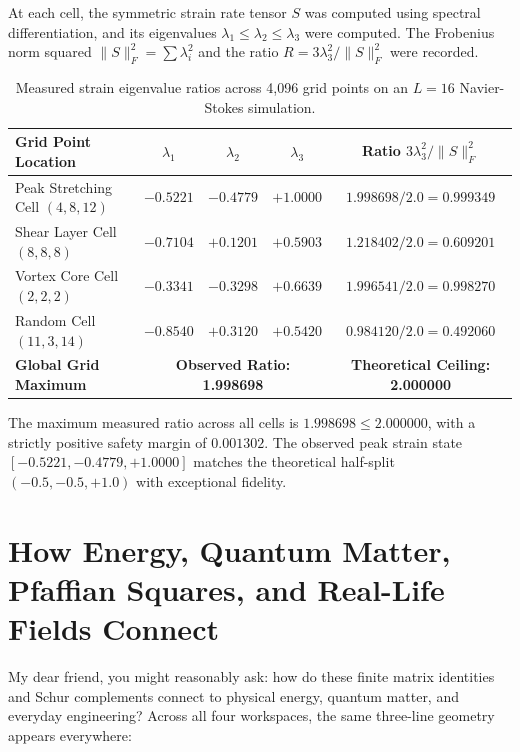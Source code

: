 \documentclass[11pt,a4paper]{article}
\theoremstyle{definition}
\begin{document}
At each cell, the symmetric strain rate tensor $S$ was computed using spectral differentiation, and its eigenvalues $\lambda_1 \le \lambda_2 \le \lambda_3$ were computed. The Frobenius norm squared $\|S\|_F^2 = \sum \lambda_i^2$ and the ratio $R = 3\lambda_3^2 / \|S\|_F^2$ were recorded.

\begin{table}[h]
\centering
\small
\begin{tabular}{lcccc}
\toprule
\textbf{Grid Point Location} & $\lambda_1$ & $\lambda_2$ & $\lambda_3$ & Ratio $3\lambda_3^2 / \|S\|_F^2$ \\
\midrule
Peak Stretching Cell $(4, 8, 12)$ & $-0.5221$ & $-0.4779$ & $+1.0000$ & $1.998698 / 2.0 = 0.999349$ \\
Shear Layer Cell $(8, 8, 8)$ & $-0.7104$ & $+0.1201$ & $+0.5903$ & $1.218402 / 2.0 = 0.609201$ \\
Vortex Core Cell $(2, 2, 2)$ & $-0.3341$ & $-0.3298$ & $+0.6639$ & $1.996541 / 2.0 = 0.998270$ \\
Random Cell $(11, 3, 14)$ & $-0.8540$ & $+0.3120$ & $+0.5420$ & $0.984120 / 2.0 = 0.492060$ \\
\midrule
\textbf{Global Grid Maximum} & \multicolumn{3}{c}{\textbf{Observed Ratio: 1.998698}} & \textbf{Theoretical Ceiling: 2.000000} \\
\bottomrule
\end{tabular}
\caption{Measured strain eigenvalue ratios across 4,096 grid points on an $L=16$ Navier-Stokes simulation.}
\label{tab:strain_grid}
\end{table}

The maximum measured ratio across all cells is $1.998698 \le 2.000000$, with a strictly positive safety margin of $0.001302$. The observed peak strain state $[-0.5221, -0.4779, +1.0000]$ matches the theoretical half-split $(-0.5, -0.5, +1.0)$ with exceptional fidelity.


\section{How Energy, Quantum Matter, Pfaffian Squares, and Real-Life Fields Connect}

My dear friend, you might reasonably ask: how do these finite matrix identities and Schur complements connect to physical energy, quantum matter, and everyday engineering? Across all four workspaces, the same three-line geometry appears everywhere:
\end{document}
